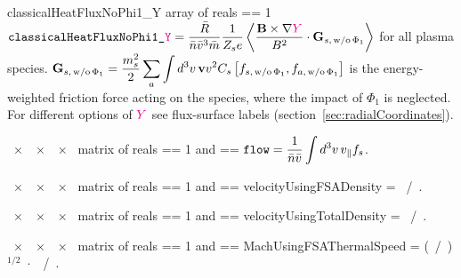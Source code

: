 \myhrule

{classicalHeatFluxNoPhi1_Y}
{ array of reals}
{ == 1}
{$\displaystyle \text{\ttfamily classicalHeatFluxNoPhi1\_\textcolor{magenta}{Y}} = \frac{\bar{R}}{\bar{n} \bar{v}^3\bar{m}} \frac{1}{Z_s e} \left\langle \frac{{\mathbf B} \times \nabla \textcolor{magenta}{Y}}{B^2} \cdot {\mathbf G}_{s,\,\mathrm{w/o}\,\Phi_1} \right\rangle$ for all plasma species.  $\displaystyle {\mathbf G}_{s,\,\mathrm{w/o}\,\Phi_1} = \frac{m_s^2}{2}\sum_a \int d^3v \, {\mathbf v} v^2 C_s \left[f_{s,\,\mathrm{w/o}\,\Phi_1}, f_{a,\,\mathrm{w/o}\,\Phi_1}\right]$ is the energy-weighted friction force acting on the species, where the impact of $\Phi_1$ is neglected.\newline
For different options of $\textcolor{magenta}{Y}$ see flux-surface labels (section~\ref{sec:radialCoordinates}).}

\myhrule

{~$\times$~~$\times$~~$\times$~ matrix of reals}
{ == 1 and  == \true}
{$\displaystyle \text{\ttfamily flow} =  \frac{1}{\bar{n} \bar{v}} \int d^3v \, v_{\|} f_s$.}

\myhrule

{~$\times$~~$\times$~~$\times$~ matrix of reals}
{ == 1 and  == \true}
{{\ttfamily velocityUsingFSADensity} =  ~/~.}

\myhrule

{~$\times$~~$\times$~~$\times$~ matrix of reals}
{ == 1 and  == \true}
{{\ttfamily velocityUsingTotalDensity} =  ~/~.}

\myhrule

{~$\times$~~$\times$~~$\times$~ matrix of reals}
{ == 1 and  == \true}
{{\ttfamily MachUsingFSAThermalSpeed} =  (~/~)${}^{1/2}$~$\cdot$~~/~.}

\myhrule

